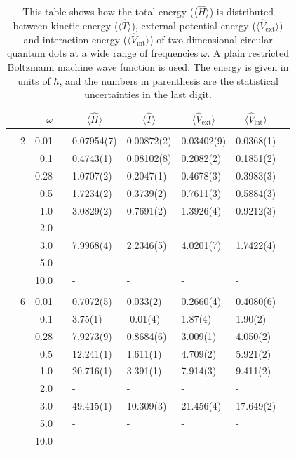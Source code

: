 \begin{table}
	\caption{This table shows how the total energy ($\langle\hat{H}\rangle$) is distributed between kinetic energy ($\langle\hat{T}\rangle$), external potential energy ($\langle\hat{V}_{\text{ext}}\rangle$) and interaction energy ($\langle\hat{V}_{\text{int}}\rangle$) of two-dimensional circular quantum dots at a wide range of frequencies $\omega$. A plain restricted Boltzmann machine wave function is used. The energy is given in units of $\hbar$, and the numbers in parenthesis are the statistical uncertainties in the last digit.}
	\label{tab:splitfrequencyQDRBM}
	\begin{tabularx}{\textwidth}{R{1cm}rrcR{2.3cm}R{2.3cm}R{2.3cm}R{2.3cm}R{1cm}} \hline\hline
		&\makecell{\\ \phantom{$N$} \\ \phantom{=}} & $\omega$ &&  &  &  &  & \\ \hline \\
		&2 & 0.01 && 0.07954(7) & 0.00872(2) & 0.03402(9) & 0.0368(1) \\
		&& 0.1 && 0.4743(1) & 0.08102(8) & 0.2082(2) & 0.1851(2) \\
		&& 0.28 && 1.0707(2) & 0.2047(1) & 0.4678(3) & 0.3983(3) \\
		&& 0.5 && 1.7234(2) & 0.3739(2) & 0.7611(3) & 0.5884(3)\\
		&& 1.0 && 3.0829(2) & 0.7691(2) & 1.3926(4) & 0.9212(3)\\
		&& 2.0 && - & - & - & -\\
		&& 3.0 && 7.9968(4) & 2.2346(5) & 4.0201(7) & 1.7422(4) \\ 
		&& 5.0 && - & - & - & -\\
		&& 10.0 && - & - & - & -\\
		\hdashline \\
		
		&6 & 0.01 && 0.7072(5) & 0.033(2) & 0.2660(4) & 0.4080(6) \\
		&& 0.1 && 3.75(1) & -0.01(4) & 1.87(4) & 1.90(2) \\
		&& 0.28 && 7.9273(9) & 0.8684(6) & 3.009(1) & 4.050(2) \\
		&& 0.5 && 12.241(1) & 1.611(1) & 4.709(2) & 5.921(2)\\
		&& 1.0 && 20.716(1) & 3.391(1) & 7.914(3) & 9.411(2)\\
		&& 2.0 && - & - & - & -\\
		&& 3.0 && 49.415(1) & 10.309(3) & 21.456(4) & 17.649(2) \\ 
		&& 5.0 && - & - & - & -\\
		&& 10.0 && - & - & - & -\\
		\hdashline \\
		

\end{tabularx}
\end{table}
